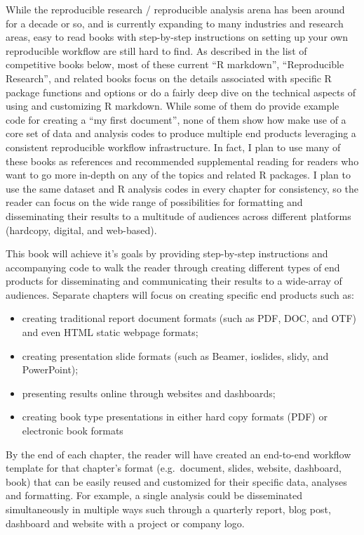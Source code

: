 \documentclass[
]{book}
\providecommand{\tightlist}{%
  \setlength{\itemsep}{0pt}\setlength{\parskip}{0pt}}
\begin{document}
While the reproducible research / reproducible analysis arena has been around for a decade or so, and is currently expanding to many industries and research areas, easy to read books with step-by-step instructions on setting up your own reproducible workflow are still hard to find. As described in the list of competitive books below, most of these current ``R markdown'', ``Reproducible Research'', and related books focus on the details associated with specific R package functions and options or do a fairly deep dive on the technical aspects of using and customizing R markdown. While some of them do provide example code for creating a ``my first document'', none of them show how make use of a core set of data and analysis codes to produce multiple end products leveraging a consistent reproducible workflow infrastructure. In fact, I plan to use many of these books as references and recommended supplemental reading for readers who want to go more in-depth on any of the topics and related R packages. I plan to use the same dataset and R analysis codes in every chapter for consistency, so the reader can focus on the wide range of possibilities for formatting and disseminating their results to a multitude of audiences across different platforms (hardcopy, digital, and web-based).

This book will achieve it's goals by providing step-by-step instructions and accompanying code to walk the reader through creating different types of end products for disseminating and communicating their results to a wide-array of audiences. Separate chapters will focus on creating specific end products such as:

\begin{itemize}
\tightlist
\item
  creating traditional report document formats (such as PDF, DOC, and OTF) and even HTML static webpage formats;
\item
  creating presentation slide formats (such as Beamer, ioslides, slidy, and PowerPoint);
\item
  presenting results online through websites and dashboards;
\item
  creating book type presentations in either hard copy formats (PDF) or electronic book formats
\end{itemize}

By the end of each chapter, the reader will have created an end-to-end workflow template for that chapter's format (e.g.~document, slides, website, dashboard, book) that can be easily reused and customized for their specific data, analyses and formatting. For example, a single analysis could be disseminated simultaneously in multiple ways such through a quarterly report, blog post, dashboard and website with a project or company logo.
\end{document}
